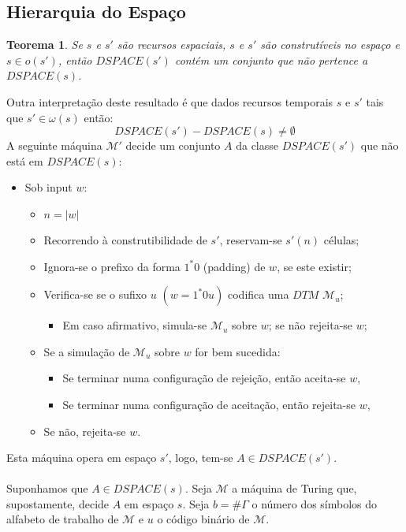 \documentclass[10pt,a4paper]{report}
\newtheorem{theorem}{Teorema}
\begin{document}
\subsection{Hierarquia do Espaço}
\begin{theorem}
Se $s$ e $s'$ são recursos espaciais, $s$ e $s'$ são construtíveis no espaço e $s \in o(s')$, então $DSPACE(s')$ contém um conjunto que não pertence a $DSPACE(s)$.
\end{theorem}
Outra interpretação deste resultado é que dados recursos temporais $s$ e $s'$ tais que $s' \in \omega(s)$ então:
$$
DSPACE(s') - DSPACE(s) \neq \emptyset
$$
A seguinte máquina $\mathcal{M'}$ decide um conjunto $A$ da classe $DSPACE(s')$ que não está em $DSPACE(s)$:
\begin{itemize}
\item Sob input $w$:
\begin{itemize}
\item $n = |w|$
\item Recorrendo à construtibilidade de $s'$, reservam-se $s'(n)$ células;
\item Ignora-se o prefixo da forma $1^*0$ (padding) de $w$, se este existir;
\item Verifica-se se o sufixo $u$ $(w = 1^*0u)$ codifica uma $DTM$ $\mathcal{M}_u$;
\begin{itemize}
\item Em caso afirmativo, simula-se $\mathcal{M}_u$ sobre $w$; se não rejeita-se $w$;
\end{itemize}
\item Se a simulação de $\mathcal{M}_u$ sobre $w$ for bem sucedida:
\begin{itemize}
\item Se terminar numa configuração de rejeição, então aceita-se $w$,
\item Se terminar numa configuração de aceitação, então rejeita-se $w$,
\end{itemize}
\item Se não, rejeita-se $w$.
\end{itemize}
\end{itemize}
Esta máquina opera em espaço $s'$, logo, tem-se $A \in DSPACE(s')$. \\
\\
Suponhamos que $A \in DSPACE(s)$. Seja $\mathcal{M}$ a máquina de Turing que, supostamente, decide $A$ em espaço $s$. Seja $b = \#\Gamma$ o número dos símbolos do alfabeto de trabalho de $\mathcal{M}$ e $u$ o código binário de $\mathcal{M}$.\\
\end{document}
